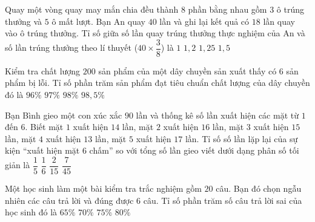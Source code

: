 \begin{ex} %
Quay một vòng quay may mắn chia đều thành $8$ phần bằng nhau gồm $3$ ô trúng thưởng và $5$ ô mất lượt. Bạn An quay $40$ lần và ghi lại kết quả có $18$ lần quay vào ô trúng thưởng. Tỉ số giữa số lần quay trúng thưởng thực nghiệm của An và số lần trúng thưởng theo lí thuyết ($40 \times \dfrac{3}{8}$) là
\choice
{$1$}
{\True $1{,}2$}
{$1{,}25$}
{$1{,}5$}
\end{ex}

\begin{ex} %
Kiểm tra chất lượng $200$ sản phẩm của một dây chuyền sản xuất thấy có $6$ sản phẩm bị lỗi. Tỉ số phần trăm sản phẩm đạt tiêu chuẩn chất lượng của dây chuyền đó là
\choice
{$96\%$}
{\True $97\%$}
{$98\%$}
{$98{,}5\%$}
\end{ex}

\begin{ex} %
Bạn Bình gieo một con xúc xắc $90$ lần và thống kê số lần xuất hiện các mặt từ $1$ đến $6$. Biết mặt $1$ xuất hiện $14$ lần, mặt $2$ xuất hiện $16$ lần, mặt $3$ xuất hiện $15$ lần, mặt $4$ xuất hiện $13$ lần, mặt $5$ xuất hiện $17$ lần. Tỉ số số lần lặp lại của sự kiện “xuất hiện mặt $6$ chấm” so với tổng số lần gieo viết dưới dạng phân số tối giản là
\choice
{$\dfrac{1}{5}$}
{\True $\dfrac{1}{6}$}
{$\dfrac{2}{15}$}
{$\dfrac{7}{45}$}
\end{ex}

\begin{ex} %
Một học sinh làm một bài kiểm tra trắc nghiệm gồm $20$ câu. Bạn đó chọn ngẫu nhiên các câu trả lời và đúng được $6$ câu. Tỉ số phần trăm số câu trả lời sai của học sinh đó là
\choice
{$65\%$}
{\True $70\%$}
{$75\%$}
{$80\%$}
\end{ex}

